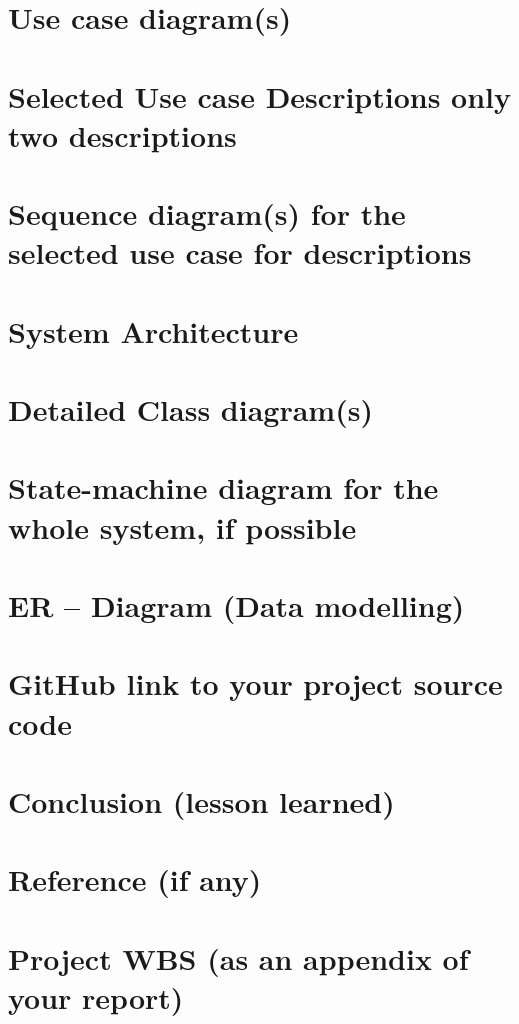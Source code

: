\documentclass[11pt]{article}
\begin{document}
    \chapter{Use case diagram(s)}


    \chapter{Selected Use case Descriptions {only two descriptions}}


    \chapter{Sequence diagram(s) {for the selected use case for descriptions}}


    \chapter{System Architecture}


    \chapter{Detailed Class diagram(s)}


    \chapter{State-machine diagram {for the whole system, if possible}}


    \chapter{ER – Diagram (Data modelling)}


    \chapter{GitHub link to your project source code}


    \chapter{Conclusion (lesson learned)}


    \chapter{Reference (if any)}


    \chapter{Project WBS (as an appendix of your report)}





    
    
\end{document}
